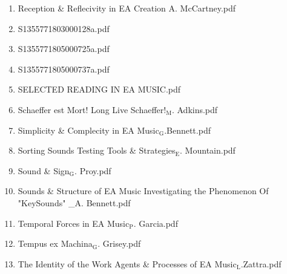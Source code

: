 \documentclass[11pt]{article}
\begin{document}
\begin{enumerate}
\item Reception \& Reflecivity in EA Creation A. McCartney.pdf
\label{sec-1-1-1-1-49-1-3-15}

\item S1355771803000128a.pdf
\label{sec-1-1-1-1-49-1-3-16}

\item S1355771805000725a.pdf
\label{sec-1-1-1-1-49-1-3-17}

\item S1355771805000737a.pdf
\label{sec-1-1-1-1-49-1-3-18}

\item SELECTED READING IN EA MUSIC.pdf
\label{sec-1-1-1-1-49-1-3-19}

\item Schaeffer est Mort! Long Live Schaeffer!$_{\text{M}}$. Adkins.pdf
\label{sec-1-1-1-1-49-1-3-20}

\item Simplicity \& Complecity in EA Music$_{\text{G}}$.Bennett.pdf
\label{sec-1-1-1-1-49-1-3-21}

\item Sorting Sounds Testing Tools \& Strategies$_{\text{E}}$. Mountain.pdf
\label{sec-1-1-1-1-49-1-3-22}

\item Sound \& Sign$_{\text{G}}$. Proy.pdf
\label{sec-1-1-1-1-49-1-3-23}

\item Sounds \& Structure of EA Music Investigating the Phenomenon Of "KeySounds" \_A. Bennett.pdf
\label{sec-1-1-1-1-49-1-3-24}

\item Temporal Forces in EA Music$_{\text{P}}$. Garcia.pdf
\label{sec-1-1-1-1-49-1-3-25}

\item Tempus ex Machina$_{\text{G}}$. Grisey.pdf
\label{sec-1-1-1-1-49-1-3-26}

\item The Identity of the Work Agents \& Processes of EA Music$_{\text{L}}$.Zattra.pdf
\label{sec-1-1-1-1-49-1-3-27}
\end{enumerate}
\end{document}

